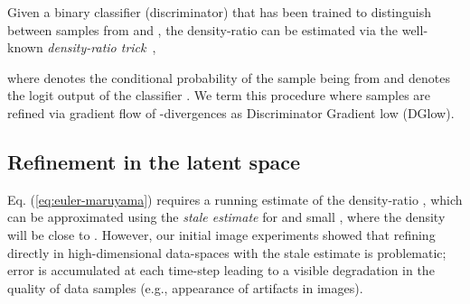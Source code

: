 \documentclass{article} \usepackage{iclr2021_conference,times}
\newcommand{\ourmethod}{\textsc{DG}low}
\begin{document}
Given a binary classifier (discriminator)  that has been trained to distinguish between samples from  and , the density-ratio  can be estimated via the well-known \emph{density-ratio trick}~\citep{sugiyama2012density},

where  denotes the conditional probability  of the sample  being from  and  denotes the logit output of the classifier . We term this procedure where samples are refined via gradient flow of -divergences as Discriminator Gradient low (\ourmethod{}).

\subsection{Refinement in the latent space}
\label{sec:latent-space-refinement}

Eq. (\ref{eq:euler-maruyama}) requires a running estimate of the density-ratio , which can be approximated using the \emph{stale estimate}  for  and small , where the density  will be close to . However, our  initial image experiments showed that refining directly in high-dimensional data-spaces with the stale estimate is problematic; error is accumulated at each time-step leading to a visible degradation in the quality of data samples (e.g., appearance of artifacts in images).
\end{document}
